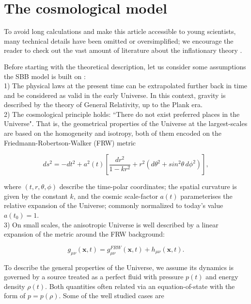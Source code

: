 \documentclass{rmaa}
\def\beq{\begin{equation}}
\def\eeq{\end{equation}}
\begin{document}
\section{The cosmological model}
To avoid long calculations and make this article accessible to young scientists, many 
technical details have been omitted or oversimplified; 
we encourage the reader to check out the vast amount of literature about the inflationary theory
 \citep{Lindeb, Kolbbo,  Liddle, LiddleLyth, Dodelson}.
 
Before starting with the theoretical description, let us consider some assumptions the
SBB model is built on \citep{Coles}:
\\ 

1) The physical laws at the present time can be extrapolated further back in time and be
 considered as valid in the early Universe. In this context, gravity is described by
 the theory of General Relativity, up to the Plank era.  
\\

 2) The cosmological principle holds: ``There do not exist preferred places in the Universe".
 That is, the geometrical properties of the Universe at the largest-scales are based on the homogeneity and isotropy,
both of them encoded on the Friedmann-Robertson-Walker (FRW) metric

\begin{equation}
 ds^2= -dt^2 + a^2(t)\left[ \frac{dr^2}{1-kr^2} +r^2 \left(d\theta^2 +sin^2\theta\, d\phi^2 \right) \right],
\end{equation}

\noindent
where $(t,r,\theta,\phi)$ describe the time-polar coordinates; the spatial curvature is given by the 
constant $k$, and the cosmic scale-factor $a(t)$ parameterises the relative expansion of the Universe; 
commonly normalized to today's value $a(t_0)=1$.
\\
  
 3) On small scales, the anisotropic Universe is well described by a linear expansion of the metric around the 
 FRW background:
 
\beq \label{eq:metric}
g_{\mu \nu}(\textbf{x},t)= g_{\mu \nu}^{FRW}(\textbf{x},t)+h_{\mu \nu}(\textbf{x},t).
\eeq

To describe the general properties of the Universe, we assume its dynamics is governed by a source treated as a
perfect fluid with pressure $p(t)$ and energy density $\rho(t)$. Both quantities often related
via an equation-of-state with the form of $p=p(\rho)$. Some of the well studied cases are  
\end{document}
